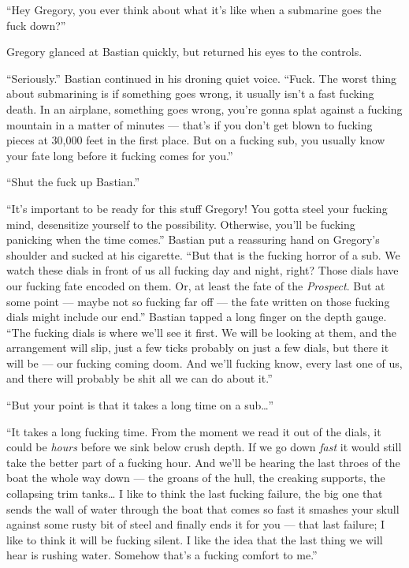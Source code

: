 \documentclass[]{article}
\begin{document}
\begin{multicols}{2}
``Hey Gregory, you ever think about what it's like when a submarine goes
the fuck down?''

Gregory glanced at Bastian quickly, but returned his eyes to the
controls.

``Seriously.'' Bastian continued in his droning quiet voice. ``Fuck. The
worst thing about submarining is if something goes wrong, it usually
isn't a fast fucking death. In an airplane, something goes wrong, you're
gonna splat against a fucking mountain in a matter of minutes --- that's
if you don't get blown to fucking pieces at 30,000 feet in the first
place. But on a fucking sub, you usually know your fate long before it
fucking comes for you.''

``Shut the fuck up Bastian.''

``It's important to be ready for this stuff Gregory! You gotta steel
your fucking mind, desensitize yourself to the possibility. Otherwise,
you'll be fucking panicking when the time comes.'' Bastian put a
reassuring hand on Gregory's shoulder and sucked at his cigarette. ``But
that is the fucking horror of a sub. We watch these dials in front of us
all fucking day and night, right? Those dials have our fucking fate
encoded on them. Or, at least the fate of the \emph{Prospect}. But at
some point --- maybe not so fucking far off --- the fate written on
those fucking dials might include our end.'' Bastian tapped a long
finger on the depth gauge. ``The fucking dials is where we'll see it
first. We will be looking at them, and the arrangement will slip, just a
few ticks probably on just a few dials, but there it will be --- our
fucking coming doom. And we'll fucking know, every last one of us, and
there will probably be shit all we can do about it.''

``But your point is that it takes a long time on a sub\ldots{}''

``It takes a long fucking time. From the moment we read it out of the
dials, it could be \emph{hours} before we sink below crush depth. If we
go down \emph{fast} it would still take the better part of a fucking
hour. And we'll be hearing the last throes of the boat the whole way
down --- the groans of the hull, the creaking supports, the collapsing
trim tanks\ldots{} I like to think the last fucking failure, the big one
that sends the wall of water through the boat that comes so fast it
smashes your skull against some rusty bit of steel and finally ends it
for you --- that last failure; I like to think it will be fucking
silent. I like the idea that the last thing we will hear is rushing
water. Somehow that's a fucking comfort to me.''


\end{multicols}
\end{document}

